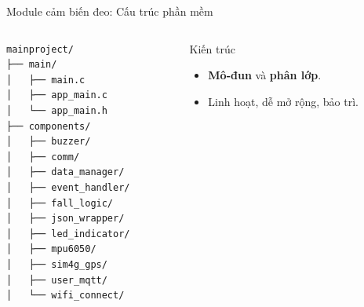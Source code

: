 \begin{frame}[fragile]{Module cảm biến đeo: Cấu trúc phần mềm}
    \begin{columns}[t]
        \begin{column}{0.55\textwidth}
            \begin{verbatim}
mainproject/
├── main/
│   ├── main.c
│   ├── app_main.c
│   └── app_main.h
├── components/
│   ├── buzzer/
│   ├── comm/
│   ├── data_manager/
│   ├── event_handler/
│   ├── fall_logic/
│   ├── json_wrapper/
│   ├── led_indicator/
│   ├── mpu6050/
│   ├── sim4g_gps/
│   ├── user_mqtt/
│   └── wifi_connect/
            \end{verbatim}
        \end{column}
        \begin{column}{0.4\textwidth}
            \begin{block}{Kiến trúc}
                \begin{itemize}
                    \item \textbf{Mô-đun} và \textbf{phân lớp}.
                    \item Linh hoạt, dễ mở rộng, bảo trì.
                \end{itemize}
            \end{block}
        \end{column}
    \end{columns}
\end{frame}

